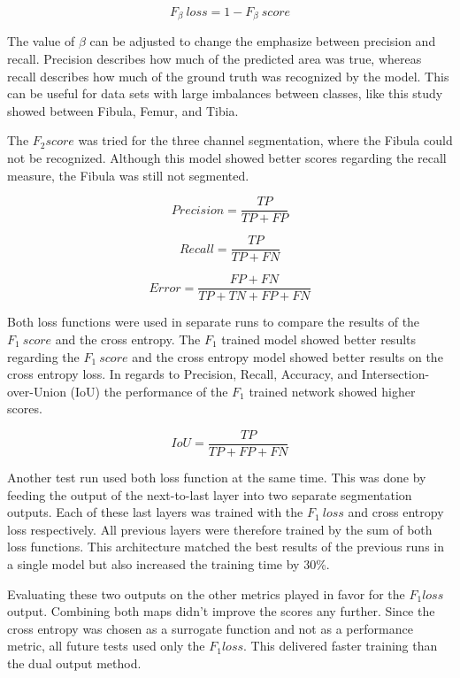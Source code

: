 \begin{equation}
F_\beta \ loss = 1 - F_\beta \ score
\end{equation}

The value of $ \beta $ can be adjusted to change the emphasize between precision and recall. Precision describes how much of the predicted area was true, whereas recall describes how much of the ground truth was recognized by the model. This can be useful for data sets with large imbalances between classes, like this study showed between Fibula, Femur, and Tibia. 

The $F_2 score$ was tried for the three channel segmentation, where the Fibula could not be recognized. Although this model showed better scores regarding the recall measure, the Fibula was still not segmented.

\begin{equation}
Precision = \frac{TP}{TP+FP}
\end{equation}

\begin{equation}
Recall = \frac{TP}{TP+FN}
\end{equation}

\begin{equation}
Error = \frac{FP+FN}{TP+TN+FP+FN}
\end{equation}

Both loss functions were used in separate runs to compare the results of the $F_1 \ score$ and the cross entropy. The $F_1$ trained model showed better results regarding the $F_1 \ score$ and the cross entropy model showed better results on the cross entropy loss. In regards to Precision, Recall, Accuracy, and Intersection-over-Union (IoU) the performance of the $F_1$ trained network showed higher scores.

\begin{equation}
IoU= \frac{TP}{TP+FP+FN}
\end{equation}

Another test run used both loss function at the same time. This was done by feeding the output of the next-to-last layer into two separate segmentation outputs. Each of these last layers was trained with the $F_1 \ loss$ and cross entropy loss respectively. All previous layers were therefore trained by the sum of both loss functions. This architecture matched the best results of the previous runs in a single model but also increased the training time by 30\%.

Evaluating these two outputs on the other metrics played in favor for the $F_1 loss$ output. Combining both maps didn't improve the scores any further. Since the cross entropy was chosen as a surrogate function and not as a performance metric, all future tests used only the $F_1 loss$. This delivered faster training than the dual output method.

